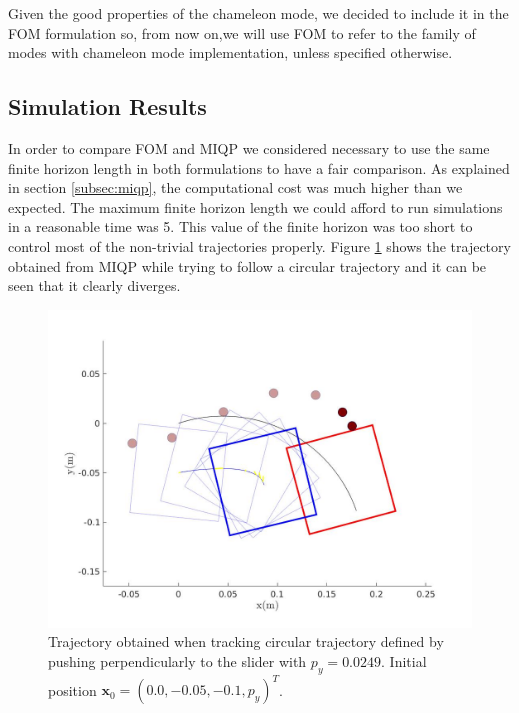 \documentclass[12,twoside]{TFG-GM}
\theoremstyle{definition}
\theoremstyle{remark}
\begin{document}
Given the good properties of the chameleon mode, we decided to include it in the FOM formulation so, from now on,we will use FOM to refer to the family of modes with chameleon mode implementation, unless specified otherwise.

\subsection{Simulation Results}
\label{subsec:simresults}

In order to compare FOM and MIQP we considered necessary to use the same finite horizon length in both formulations to have a fair comparison. As explained in section \ref{subsec:miqp}, the computational cost was much higher than we expected. The maximum finite horizon length we could afford to run simulations in a reasonable time was 5. This value of the finite horizon was too short to control most of the non-trivial trajectories properly. Figure \ref{fig:MIQP_trajectory} shows the trajectory obtained from MIQP while trying to follow a circular trajectory and it can be seen that it clearly diverges.

\begin{figure}[htb!]
\begin{center}
\includegraphics[width=13cm]{MIQP_trajectory.jpg}
\end{center}
\caption{\label{fig:MIQP_trajectory} \small Trajectory obtained when tracking circular trajectory defined by pushing perpendicularly to the slider with $p_y = 0.0249$. Initial position $\textbf{x}_0 = (0.0, -0.05, -0.1, p_y)^T$.}
\end{figure}
\end{document}
